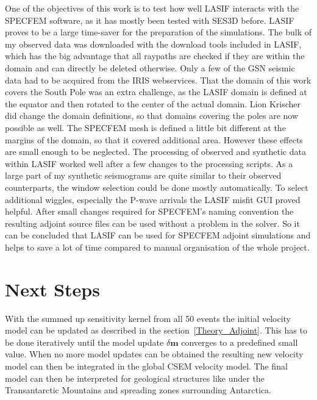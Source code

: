 One of the objectives of this work is to test how well LASIF interacts with the SPECFEM software,
as it has mostly been tested with SES3D before.
LASIF proves to be a large time-saver for the preparation of the simulations. 
The bulk of my observed data was downloaded with the download tools included in LASIF, which 
has the big advantage that all raypaths are checked if they are within the domain and can 
directly be deleted otherwise.
Only a few of the GSN seismic data had to be acquired from the IRIS webservices.
That the domain of this work covers the South Pole was an extra challenge, as the LASIF domain
is defined at the equator and then rotated to the center of the actual domain.
Lion Krischer did change the domain definitions, so that domains covering the poles  are now 
possible as well. 
The SPECFEM mesh is defined a little bit different at the margins of the domain, so that it 
covered additional area. However these effects are small enough to be neglected.
The processing of observed and synthetic data within LASIF worked well after a few changes to
the processing scripts.
As a large part of my synthetic seismograms are quite similar to their observed counterparts,
the window selection could be done mostly automatically. 
To select additional wiggles, especially the P-wave arrivals the LASIF misfit GUI proved helpful.
After small changes required for SPECFEM's naming convention the resulting adjoint source files
can be used without a problem in the solver.
So it can be concluded that LASIF can be used for SPECFEM adjoint simulations and helps to save a 
lot of time compared to manual organisation of the whole project.


\section{Next Steps}

With the summed up sensitivity kernel from all 50 events the initial velocity
model can be updated as described in the section~\ref{Theory_Adjoint}.
This has to be done iteratively until the model update $\delta \boldsymbol{m}$
converges to a predefined small value.
When no more model updates can be obtained the resulting new velocity model 
can then be integrated in the global CSEM velocity model.
The final model can then be interpreted for geological structures like 
under the Transantarctic Mountains and spreading zones surrounding Antarctica.

\vspace*{1cm}
